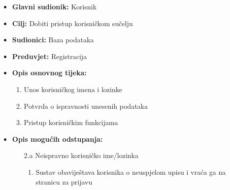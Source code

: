                         \noindent {}
					\begin{itemize}
	
						\item \textbf{Glavni sudionik: }Korisnik
						\item  \textbf{Cilj:} Dobiti pristup korisničkom sučelju
						\item  \textbf{Sudionici:} Baza podataka
						\item  \textbf{Preduvjet:} Registracija
						\item  \textbf{Opis osnovnog tijeka:}
						
						\item[] \begin{enumerate}
							\item Unos korisničkog imena i lozinke
                                \item Potvrda o ispravnosti unesenih podataka
                                \item Pristup korisničkim funkcijama
						\end{enumerate}

                            \item  \textbf{Opis mogućih odstupanja:}
						
						\item[] \begin{enumerate}
	
							\item[2.a] Neispravno korisničko ime/lozinka
							\item[] \begin{enumerate}
								
								\item Sustav obaviještava korisnika o neuspjelom upisu i vraća ga na stranicu za prijavu\\
								
							\end{enumerate}
			
							
						\end{enumerate}
						
					\end{itemize}

